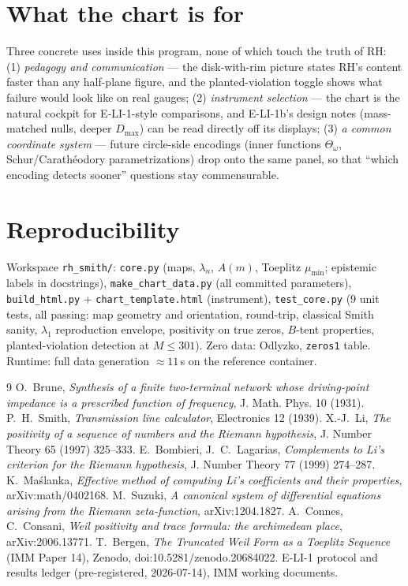\documentclass[11pt]{article}
\theoremstyle{remark}
\begin{document}
\section{What the chart is for}

Three concrete uses inside this program, none of which touch the truth of RH:
(1) \emph{pedagogy and communication} --- the disk-with-rim picture states RH's content
faster than any half-plane figure, and the planted-violation toggle shows what failure
would look like on real gauges; (2) \emph{instrument selection} --- the chart is the natural
cockpit for E-LI-1-style comparisons, and E-LI-1b's design notes (mass-matched nulls,
deeper $D_{\max}$) can be read directly off its displays; (3) \emph{a common coordinate
system} --- future circle-side encodings (inner functions $\Theta_\omega$, Schur/Carath\'eodory
parametrizations) drop onto the same panel, so that ``which encoding detects sooner''
questions stay commensurable.

\appendix
\section{Reproducibility}\label{app:repro}
Workspace \texttt{rh\_smith/}: \texttt{core.py} (maps, $\lambda_n$, $A(m)$, Toeplitz
$\mu_{\min}$; epistemic labels in docstrings), \texttt{make\_chart\_data.py} (all committed
parameters), \texttt{build\_html.py} + \texttt{chart\_template.html} (instrument),
\texttt{test\_core.py} (9 unit tests, all passing: map geometry and orientation, round-trip,
classical Smith sanity, $\lambda_1$ reproduction envelope, positivity on true zeros,
$B$-tent properties, planted-violation detection at $M\le301$). Zero data:
Odlyzko, \texttt{zeros1} table. Runtime: full data generation $\approx11$\,s on the
reference container.

\begin{thebibliography}{9}\small
{} O.~Brune, \emph{Synthesis of a finite two-terminal network whose
driving-point impedance is a prescribed function of frequency}, J. Math. Phys. 10 (1931).
 P.~H.~Smith, \emph{Transmission line calculator}, Electronics 12 (1939).
 X.-J.~Li, \emph{The positivity of a sequence of numbers and the Riemann
hypothesis}, J. Number Theory 65 (1997) 325--333.
 E.~Bombieri, J.~C.~Lagarias, \emph{Complements to Li's criterion for the
Riemann hypothesis}, J. Number Theory 77 (1999) 274--287.
 K.~Ma\'slanka, \emph{Effective method of computing Li's coefficients and
their properties}, arXiv:math/0402168.
 M.~Suzuki, \emph{A canonical system of differential equations arising from
the Riemann zeta-function}, arXiv:1204.1827.
 A.~Connes, C.~Consani, \emph{Weil positivity and trace formula: the archimedean
place}, arXiv:2006.13771.
 T.~Bergen, \emph{The Truncated Weil Form as a Toeplitz Sequence} (IMM Paper
14), Zenodo, doi:10.5281/zenodo.20684022.
 E-LI-1 protocol and results ledger (pre-registered, 2026-07-14), IMM working
documents.
\end{thebibliography}
\end{document}
